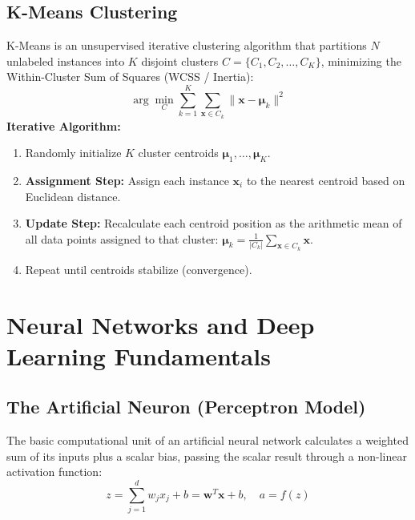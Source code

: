 \subsection{K-Means Clustering}
K-Means is an unsupervised iterative clustering algorithm that partitions $N$ unlabeled instances into $K$ disjoint clusters $C = \{C_1, C_2, \dots, C_K\}$, minimizing the Within-Cluster Sum of Squares (WCSS / Inertia):
\begin{equation}
\label{eq:kmeans_wcss}
\arg\min_C \sum_{k=1}^K \sum_{\mathbf{x} \in C_k} \|\mathbf{x} - \boldsymbol{\mu}_k\|^2
\end{equation}
\textbf{Iterative Algorithm:}
\begin{enumerate}
    \item Randomly initialize $K$ cluster centroids $\boldsymbol{\mu}_1, \dots, \boldsymbol{\mu}_K$.
    \item \textbf{Assignment Step:} Assign each instance $\mathbf{x}_i$ to the nearest centroid based on Euclidean distance.
    \item \textbf{Update Step:} Recalculate each centroid position as the arithmetic mean of all data points assigned to that cluster: $\boldsymbol{\mu}_k = \frac{1}{|C_k|} \sum_{\mathbf{x} \in C_k} \mathbf{x}$.
    \item Repeat until centroids stabilize (convergence).
\end{enumerate}


\section{Neural Networks and Deep Learning Fundamentals}
\label{sec:neural_networks}

\subsection{The Artificial Neuron (Perceptron Model)}
The basic computational unit of an artificial neural network calculates a weighted sum of its inputs plus a scalar bias, passing the scalar result through a non-linear activation function:
\begin{equation}
z = \sum_{j=1}^d w_j x_j + b = \mathbf{w}^T \mathbf{x} + b, \quad a = f(z)
\end{equation}

